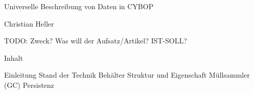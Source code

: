 
Universelle Beschreibung von Daten in CYBOP

Christian Heller

TODO:
Zweck?
Was will der Aufsatz/Artikel?
IST-SOLL?

Inhalt

Einleitung
Stand der Technik
Behälter
Struktur und Eigenschaft
Müllsammler (GC)
Persistenz
